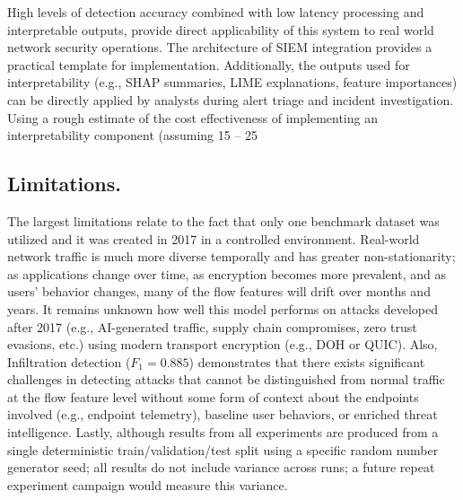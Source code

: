 High levels of detection accuracy combined with low latency processing and interpretable outputs, provide direct applicability of this system to real world network security operations. The architecture of SIEM integration provides a practical template for implementation. Additionally, the outputs used for interpretability (e.g., SHAP summaries, LIME explanations, feature importances) can be directly applied by analysts during alert triage and incident investigation. Using a rough estimate of the cost effectiveness of implementing an interpretability component (assuming 15 -- 25 %

\subsection{Limitations.}

The largest limitations relate to the fact that only one benchmark dataset was utilized and it was created in 2017 in a controlled environment. Real-world network traffic is much more diverse temporally and has greater non-stationarity; as applications change over time, as encryption becomes more prevalent, and as users' behavior changes, many of the flow features will drift over months and years. It remains unknown how well this model performs on attacks developed after 2017 (e.g., AI-generated traffic, supply chain compromises, zero trust evasions, etc.) using modern transport encryption (e.g., DOH or QUIC). Also, Infiltration detection ($F_1 = 0.885$) demonstrates that there exists significant challenges in detecting attacks that cannot be distinguished from normal traffic at the flow feature level without some form of context about the endpoints involved (e.g., endpoint telemetry), baseline user behaviors, or enriched threat intelligence. Lastly, although results from all experiments are produced from a single deterministic train/validation/test split using a specific random number generator seed; all results do not include variance across runs; a future repeat experiment campaign would measure this variance.